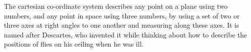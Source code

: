 The cartesian co-ordinate system describes any point
on a plane using two numbers, and any point in space using
three numbers, by using a set of two or three axes at 
right angles to one another and measuring along these axes.
It is named after Descartes, who invented it while thinking
about how to describe the positions of flies on his ceiling
when he was ill.